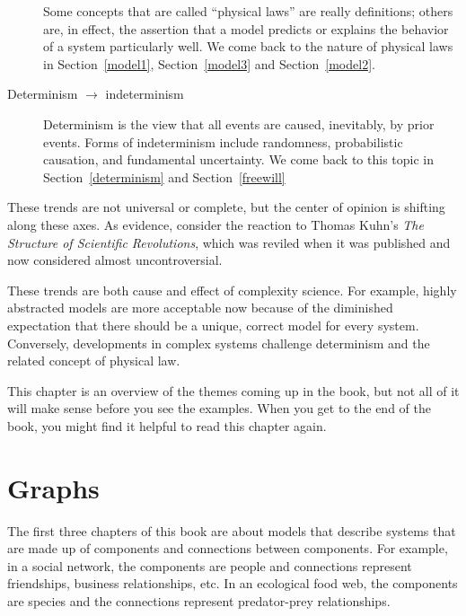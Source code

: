 \documentclass[12pt]{book}
\theoremstyle{exercise}
\begin{document}
\begin{description}

  Some concepts that are called ``physical laws'' are really
  definitions; others are, in effect, the assertion that a model
  predicts or explains the behavior of a system particularly well.
  We come back to the nature of physical laws 
  in Section~\ref{model1}, Section~\ref{model3} and Section~\ref{model2}.

\item[Determinism $\rightarrow$ indeterminism] Determinism is the view
  that all events are caused, inevitably, by prior events.  Forms of
  indeterminism include randomness, probabilistic causation, and
  fundamental uncertainty.  We come back to this
  topic in Section~\ref{determinism} and Section~\ref{freewill}


\end{description}

These trends are not universal or complete, but the center of
opinion is shifting along these axes.  As evidence, consider the
reaction to Thomas Kuhn's {\em The Structure of Scientific
  Revolutions}, which was reviled when it was published and
now considered almost uncontroversial.


These trends are both cause and effect of complexity science.  For
example, highly abstracted models are more acceptable now because of
the diminished expectation that there should be a unique, correct model
for every system.  Conversely, developments in complex systems
challenge determinism and the related concept of physical law.

This chapter is an overview of the themes coming up in the book, but
not all of it will make sense before you see the examples.  When you
get to the end of the book, you might find it helpful to read this
chapter again.


\chapter{Graphs}
\label{graphs}

\newcommand{\Erdos}{Erd\H{o}s}
\newcommand{\Renyi}{R\'{e}nyi}

The first three chapters of this book are about models that describe
systems that are made up of components and connections between components.
For example, in a social network, the components are people and connections represent friendships, business relationships, etc.  In an ecological food web, the components are species and the connections represent predator-prey relationships.
\end{document}
